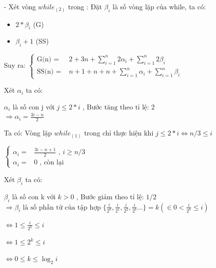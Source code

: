 \documentclass{article}
\newcommand\tab[1][1cm]{\hspace*{#1}}
\begin{document}
\vspace{15mm}

- Xét vòng $while_{(2)}$ trong :
Đặt $\beta_{i}$ là số vòng lặp của while, ta có:
\begin{itemize}
    \item $ 2*\beta_{i}$ (G)
    \item $ \beta_{i} + 1$ (SS)
\end{itemize}

\tab Suy ra:
\(
\begin{cases}
    \text{G(n) = } & 2 + 3n +  \sum\limits_{i=1}^{n}2\alpha_{i} + \sum\limits_{i=1}^{n}2\beta_{i} \\
    \text{SS(n) = } &  n + 1 + n + n + \sum\limits_{i=1}^{n}\alpha_{i} + \sum\limits_{i=1}^{n}\beta_{i}
\end{cases}
\)
\vspace{20mm}

Xét $\alpha_{i}$ ta có:

\tab $\alpha_{i}$ là số con j với $j \leq 2*i $ , \(\text{Bước tăng theo tỉ lệ: } 2\)\\

\(\Rightarrow  \alpha_{i} = \frac{3i - n}{2}\) 
\vspace{5mm}

Ta có:
\tab Vòng lặp $while_{(1)}$ trong chỉ thực hiện khi $ j \leq 2*i \Longleftrightarrow n/3 \leq i$

\vspace{5mm}
\(
\begin{cases}
    \alpha_{i} =  & \frac{3i-n + 1}{2} \text{ , } i \geq n/3  \\
    \alpha_{i} =  & 0 \text{ , còn lại}
\end{cases}
\)
 
\vspace{20mm}
Xét $\beta_{i}$ ta có:

\tab $\beta_{i}$ là số con k với $k > 0 $ , \(\text{Bước giảm theo tỉ lệ: } 1/2\)\\


\(\Rightarrow  \beta_{i} \text{ là số phần tử của tập hợp } \{ \frac{i}{2^0}, \frac{i}{2^1},  \frac{i}{2^2},  \frac{i}{2^3}... \}
= k (\in 0 < \frac{i}{2^k} \leq i)\) 
\vspace{5mm}

\(\Leftrightarrow  1 \leq  \frac{i}{2^k} \leq  i\)

\vspace{2mm}
\(\Leftrightarrow  1 \leq  2^k \leq  i\)

\vspace{2mm}
\(\Leftrightarrow  0 \leq k \leq  \log_{2}{i} \) 
\end{document}
